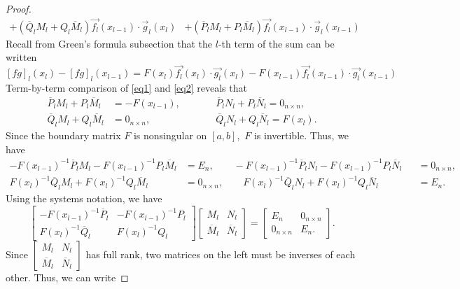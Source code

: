 \documentclass[11pt,reqno,oneside,a4paper]{article}
\theoremstyle{plain} %
\theoremstyle{definition}
\theoremstyle{remark}
\begin{document}
\begin{proof}
\begin{equation}
\begin{aligned}
+   (\overline{Q}_l  M_l +Q_l \overline{M}_l) \vec{f_l}(x_{l-1}) \cdot\vec{g}_l(x_l) &+  (\overline{P}_l M_l+P_l \overline{M}_l) \vec{f_l}(x_{l-1}) \cdot  \vec{g}_l(x_{l-1}) 
\end{aligned}
\end{equation}
Recall from Green's formula subsection that the $l$-th term of the sum can be written
\begin{equation}\label{eq2}
[fg]_l(x_l) - [fg]_l(x_{l-1}) = F(x_l) \vec{f_l}(x_l) \cdot \vec{g_l}(x_l) - F(x_{l-1}) \vec{f_l}(x_{l-1}) \cdot \vec{g_l}(x_{l-1}) 
\end{equation}
Term-by-term comparison of \eqref{eq1} and \eqref{eq2} reveals that 
\begin{align*}
\overline{P}_l M_l+P_l \overline{M}_l &= - F(x_{l-1}), \qquad &&\overline{P}_l N_l  + P_l\overline{N}_l = 0_{n\times n}, \\
\overline{Q}_l  M_l +Q_l \overline{M}_l &= 0_{n\times n},  \qquad &&\overline{Q}_l N_l + Q_l \overline{N}_l = F(x_l).
\end{align*}
Since the boundary matrix $F$ is nonsingular on $[a,b],$ $F$ is invertible. Thus, we have 
\begin{align*}
- F(x_{l-1})^{-1} \overline{P}_l M_l - F(x_{l-1})^{-1} P_l \overline{M}_l &= E_n, \qquad -F(x_{l-1})^{-1}\overline{P}_l N_l  - F(x_{l-1})^{-1} P_l\overline{N}_l &&= 0_{n\times n}, \\
F(x_l)^{-1}\overline{Q}_l  M_l +F(x_l)^{-1}Q_l \overline{M}_l &= 0_{n\times n},  \qquad F(x_l)^{-1}\overline{Q}_l N_l + F(x_l)^{-1} Q_l \overline{N}_l &&= E_n.
\end{align*}
Using the systems notation, we have 
\[ 
\begin{bmatrix}
- F(x_{l-1})^{-1} \overline{P}_l & - F(x_{l-1})^{-1} P_l \\
F(x_l)^{-1}\overline{Q}_l & F(x_l)^{-1}Q_l 
\end{bmatrix}
\begin{bmatrix}
M_l & N_l \\
\overline{M}_l & \overline{N}_l
\end{bmatrix} = 
\begin{bmatrix}
E_n & 0_{n\times n} \\
0_{n\times n} & E_n.
\end{bmatrix}.
\]
Since $\begin{bmatrix}
M_l & N_l \\
\overline{M}_l & \overline{N}_l
\end{bmatrix}$ has full rank, two matrices on the left must be inverses of each other. Thus, we can write

\end{proof}
\end{document}

